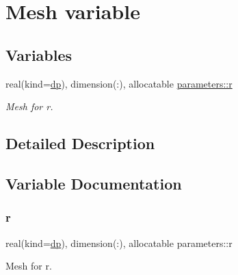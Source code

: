 \hypertarget{group__MESH}{}\section{Mesh variable}
\label{group__MESH}
\subsection*{Variables}
\begin{DoxyCompactItemize}
\item 
real(kind=\mbox{\hyperlink{namespaceparameters_a52f8c6351fd79345d8811e065bcbbb37}{dp}}), dimension(\+:), allocatable \mbox{\hyperlink{group__MESH_gab0ff28e85164200c8d56a8097bb2fe54}{parameters\+::r}}
\begin{DoxyCompactList}\small\item\em Mesh for r. \end{DoxyCompactList}\end{DoxyCompactItemize}


\subsection{Detailed Description}


\subsection{Variable Documentation}
\mbox{\label{group__MESH_gab0ff28e85164200c8d56a8097bb2fe54}} 
\subsubsection{\texorpdfstring{r}{r}}
{\footnotesize\ttfamily real(kind=\mbox{\hyperlink{namespaceparameters_a52f8c6351fd79345d8811e065bcbbb37}{dp}}), dimension(\+:), allocatable parameters\+::r}



Mesh for r. 

